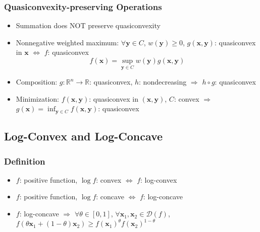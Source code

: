 \subsubsection*{Quasiconvexity-preserving Operations}
\begin{itemize}
    \item Summation does NOT preserve quasiconvexity
    \item Nonnegative weighted maximum: $\forall \mathbf{y} \in C$, $w(\mathbf{y}) \geq 0$,
        $g(\mathbf{x}, \mathbf{y})$: quasiconvex in $\mathbf{x}$ $\Leftrightarrow$ $f$: quasiconvex
        \begin{equation}f(\mathbf{x}) = \sup_{\mathbf{y} \in C} w(\mathbf{y})g(\mathbf{x}, \mathbf{y})\end{equation}
    \item Composition: $g: \mathbb{R}^n \rightarrow \mathbb{R}$: quasiconvex, $h$: nondecreasing $\Rightarrow$ $h \circ g$: quasiconvex
    \item Minimization: $f(\mathbf{x}, \mathbf{y})$: quasiconvex in  $(\mathbf{x},\mathbf{y})$, $C$: convex
        $\Rightarrow$ $g(\mathbf{x}) = \inf_{\mathbf{y} \in C} f(\mathbf{x}, \mathbf{y})$: quasiconvex
\end{itemize}

\subsection{Log-Convex and Log-Concave}

\subsubsection*{Definition}
\begin{itemize}
    \item $f$: positive function, $\log f$: convex $\Leftrightarrow$ $f$: log-convex
    \item $f$: positive function, $\log f$: concave $\Leftrightarrow$ $f$: log-concave
    \item $f$: log-concave $\Rightarrow$ $\forall \theta \in [0,1]$, $\forall \mathbf{x}_1,\mathbf{x}_2 \in \mathcal{D}(f)$,
        $f(\theta \mathbf{x}_1 + (1 - \theta) \mathbf{x}_2) \geq f(\mathbf{x}_1)^{\theta} f(\mathbf{x}_2)^{1-\theta}$
\end{itemize}

